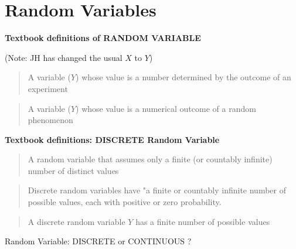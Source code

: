 \documentclass[]{book}
\begin{document}
\hypertarget{random-variables}{%
\section{Random Variables}\label{random-variables}}

\textbf{Textbook definitions of RANDOM VARIABLE}

(Note: JH has changed the usual \(X\) to \(Y\))

\begin{quote}
A variable (\(Y\)) whose value is a number determined by the outcome of an experiment
\end{quote}

\begin{quote}
A variable (\(Y\)) whose value is a numerical outcome of a random phenomenon
\end{quote}

\textbf{Textbook definitions: DISCRETE Random Variable}

\begin{quote}
A random variable that assumes only a finite (or countably infinite) number of distinct values
\end{quote}

\begin{quote}
Discrete random variables have "a finite or countably infinite number of possible values, each with positive or zero probability.
\end{quote}

\begin{quote}
A discrete random variable \(Y\) has a finite number of possible values
\end{quote}

Random Variable: DISCRETE or CONTINUOUS ?
\end{document}
